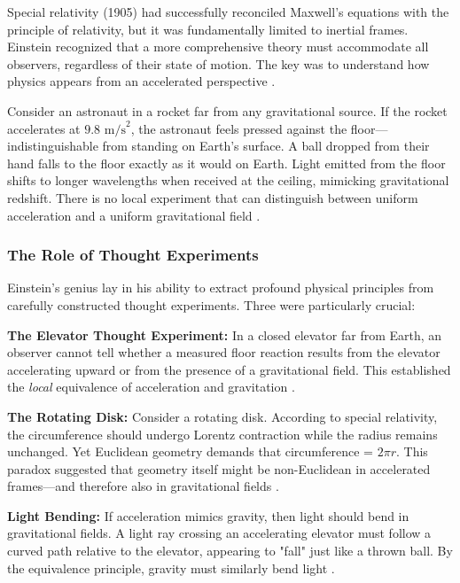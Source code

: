 \documentclass[12pt, a4paper]{article}
\begin{document}
	Special relativity (1905) had successfully reconciled Maxwell's equations with the principle of relativity, but it was fundamentally limited to inertial frames. Einstein recognized that a more comprehensive theory must accommodate all observers, regardless of their state of motion. The key was to understand how physics appears from an accelerated perspective \citep{hughesMIT8962General2020}.
	
	Consider an astronaut in a rocket far from any gravitational source. If the rocket accelerates at \(9.8\text{ m/s}^2\), the astronaut feels pressed against the floor---indistinguishable from standing on Earth's surface. A ball dropped from their hand falls to the floor exactly as it would on Earth. Light emitted from the floor shifts to longer wavelengths when received at the ceiling, mimicking gravitational redshift. There is no local experiment that can distinguish between uniform acceleration and a uniform gravitational field \citep{carrollSpacetimeGeometryIntroduction2019}.
	
	\subsubsection{The Role of Thought Experiments}
	
	Einstein's genius lay in his ability to extract profound physical principles from carefully constructed thought experiments. Three were particularly crucial:
	
	\textbf{The Elevator Thought Experiment:} In a closed elevator far from Earth, an observer cannot tell whether a measured floor reaction results from the elevator accelerating upward or from the presence of a gravitational field. This established the \textit{local} equivalence of acceleration and gravitation \citep{carrollSpacetimeGeometryIntroduction2019}.
	
	\textbf{The Rotating Disk:} Consider a rotating disk. According to special relativity, the circumference should undergo Lorentz contraction while the radius remains unchanged. Yet Euclidean geometry demands that circumference = \(2\pi r\). This paradox suggested that geometry itself might be non-Euclidean in accelerated frames---and therefore also in gravitational fields \citep{hughesMIT8962General2020}.
	
	\textbf{Light Bending:} If acceleration mimics gravity, then light should bend in gravitational fields. A light ray crossing an accelerating elevator must follow a curved path relative to the elevator, appearing to "fall" just like a thrown ball. By the equivalence principle, gravity must similarly bend light \citep{carrollSpacetimeGeometryIntroduction2019}.
	
\end{document}
